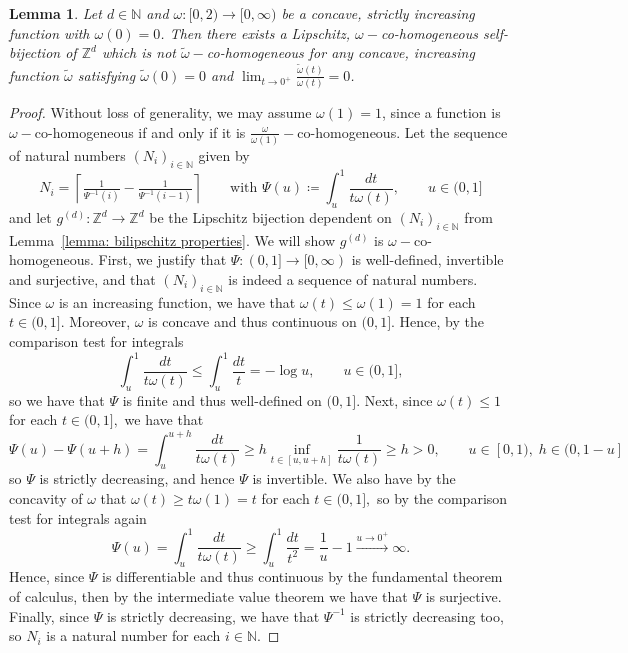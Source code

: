 \documentclass{article}
\newtheorem{lemma}[define]{Lemma}
\newcommand{\Z}{\mathbb{Z}}
\newcommand{\N}{\mathbb{N}}
\begin{document}
\begin{lemma} \label{lemma: cohom examples}
Let $d \in \N$ and $\omega:[0,2) \to [0,\infty)$ be a concave, strictly increasing function with $\omega(0) = 0$. Then there exists a Lipschitz, $\omega-$co-homogeneous self-bijection of $\Z^d$ which is not $\widetilde{\omega}-$co-homogeneous for any concave, increasing function $\widetilde{\omega}$ satisfying $\widetilde{\omega}(0)=0$ and $\lim_{t \to 0^{+}}\tfrac{\widetilde{\omega}(t)}{\omega(t)}=0$. 
\end{lemma}
\begin{proof}
Without loss of generality, we may assume $\omega(1) = 1$, since a function is $\omega-$co-homogeneous if and only if it is $\frac{\omega}{\omega(1)}-$co-homogeneous. Let the sequence of natural numbers $(N_i)_{i \in \N}$ given by
$$N_i = \left\lceil \tfrac{1}{\Psi^{-1}(i)}-\tfrac{1}{\Psi^{-1}(i-1)}\right\rceil \qquad \text{with } \Psi(u)\coloneqq \int_{u}^{1}\frac{dt}{t \omega(t)}, \qquad u \in (0,1]$$
and let $g^{(d)}:\Z^d \to \Z^d$ be the Lipschitz bijection  dependent on $(N_i)_{i \in \N}$ from Lemma~\ref{lemma: bilipschitz properties}.
We will show $g^{(d)}$ is $\omega-$co-homogeneous. 
    First, we justify that $\Psi:(0,1] \to [0,\infty)$ is well-defined, invertible and surjective, and that $(N_i)_{i \in \N}$ is indeed a sequence of natural numbers. Since $\omega$ is an increasing function, we have that $\omega(t) \leq \omega(1) = 1$ for each $t \in (0,1].$ Moreover, $\omega$ is concave and thus continuous on $(0,1]$. Hence, by the comparison test for integrals $$\int_u^1 \frac{dt}{t\omega(t)} \leq \int_u^1 \frac{dt}{t} = -\log u, \qquad u \in (0,1],$$ so we have that $\Psi$ is finite and thus well-defined on $(0,1]$. Next, since $\omega(t) \leq 1$ for each $t \in (0,1],$ we have that
    $$\Psi(u)-\Psi(u+h) = \int_u^{u+h} \frac{dt}{t\omega(t)} \geq h\inf_{t \in [u,u+h]}\frac{1}{t\omega(t)} \geq h>0, \qquad u \in [0,1),\;h\in (0,1-u]$$
    so $\Psi$ is strictly decreasing, and hence $\Psi$ is invertible. We also have by the concavity of $\omega$ that $\omega(t) \geq t\omega(1)=t$ for each $t \in (0,1],$ so by the comparison test for integrals again
    $$\Psi(u) =\int_u^1 \frac{dt}{t\omega(t)} \geq \int_u^1 \frac{dt}{t^2} = \frac{1}{u}-1 \xrightarrow{u \to 0^+}\infty.$$ Hence, since $\Psi$ is differentiable and thus continuous by the fundamental theorem of calculus, then by the intermediate value theorem we have that $\Psi$ is surjective.
    Finally, since $\Psi$ is strictly decreasing, we have that $\Psi^{-1}$ is strictly decreasing too, so $N_i$ is a natural number for each $i \in \N.$


\end{proof}
\end{document}
